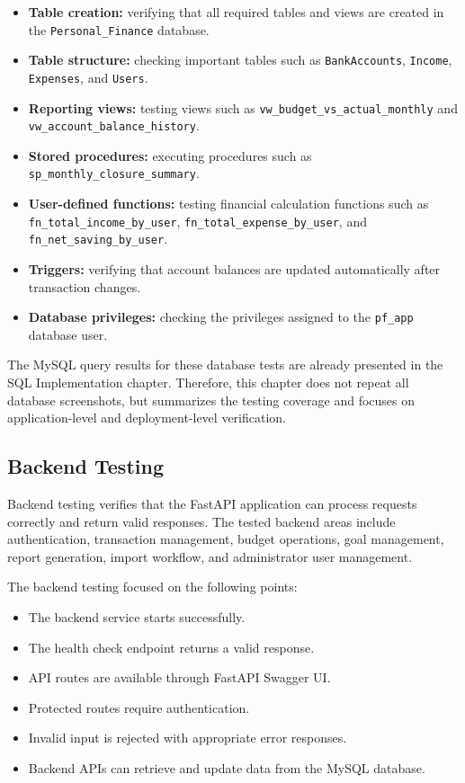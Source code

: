 \documentclass{article}
\begin{document}
\begin{itemize}
    \item \textbf{Table creation:} verifying that all required tables and views are created in the \texttt{Personal\_Finance} database.
    \item \textbf{Table structure:} checking important tables such as \texttt{BankAccounts}, \texttt{Income}, \texttt{Expenses}, and \texttt{Users}.
    \item \textbf{Reporting views:} testing views such as \texttt{vw\_budget\_vs\_actual\_monthly} and \texttt{vw\_account\_balance\_history}.
    \item \textbf{Stored procedures:} executing procedures such as \texttt{sp\_monthly\_closure\_summary}.
    \item \textbf{User-defined functions:} testing financial calculation functions such as \texttt{fn\_total\_income\_by\_user}, \texttt{fn\_total\_expense\_by\_user}, and \texttt{fn\_net\_saving\_by\_user}.
    \item \textbf{Triggers:} verifying that account balances are updated automatically after transaction changes.
    \item \textbf{Database privileges:} checking the privileges assigned to the \texttt{pf\_app} database user.
\end{itemize}

The MySQL query results for these database tests are already presented in the SQL Implementation chapter. Therefore, this chapter does not repeat all database screenshots, but summarizes the testing coverage and focuses on application-level and deployment-level verification.

\subsection{Backend Testing}

Backend testing verifies that the FastAPI application can process requests correctly and return valid responses. The tested backend areas include authentication, transaction management, budget operations, goal management, report generation, import workflow, and administrator user management.

The backend testing focused on the following points:

\begin{itemize}
    \item The backend service starts successfully.
    \item The health check endpoint returns a valid response.
    \item API routes are available through FastAPI Swagger UI.
    \item Protected routes require authentication.
    \item Invalid input is rejected with appropriate error responses.
    \item Backend APIs can retrieve and update data from the MySQL database.
\end{itemize}
\end{document}
